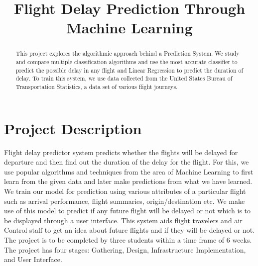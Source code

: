 \documentclass[10pt,conference]{IEEEtran}
\begin{document}
\title{Flight Delay Prediction Through Machine Learning}
\author{
\and
{}
\and
{}
}

\maketitle
\begin{abstract}
\textnormal{
This project explores the algorithmic approach behind a Prediction System. We study and compare multiple classification algorithms and use the most accurate classifier to predict the possible delay in any flight and Linear Regression to predict the duration of delay. To train this system, we use data collected from the United States Bureau of Transportation Statistics, a data set of various flight journeys.
}
\end{abstract}

\IEEEpeerreviewmaketitle
\section{Project Description}\label{sec:1. Project Description}
\textnormal{
Flight delay predictor system predicts whether the flights will be delayed for departure and then find out the duration of the delay for the flight. For this, we use popular algorithms and techniques from the area of Machine Learning to first learn from the given data and later make predictions from what we have learned. We  train our model for prediction using various attributes of a particular flight such as arrival performance, flight summaries, origin/destination etc. We make use of this model to predict if any future flight will be delayed or not which is to be displayed through a user interface. This system aids flight travelers and air Control staff to get an idea about future flights and if they will be delayed or not. The project is to be completed by three students within a time frame of 6 weeks. The project has four stages: Gathering, Design, Infrastructure Implementation, and User Interface. }
\end{document}
